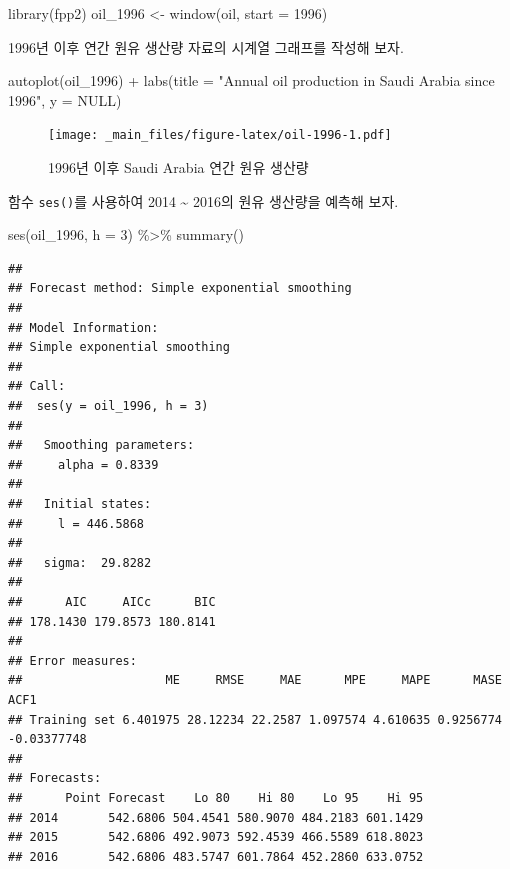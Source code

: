 \documentclass[
]{book}
\newenvironment{Shaded}{\begin{snugshade}}{\end{snugshade}}
\newcommand{\AttributeTok}[1]{\textcolor[rgb]{0.77,0.63,0.00}{#1}}
\newcommand{\ConstantTok}[1]{\textcolor[rgb]{0.00,0.00,0.00}{#1}}
\newcommand{\DecValTok}[1]{\textcolor[rgb]{0.00,0.00,0.81}{#1}}
\newcommand{\FunctionTok}[1]{\textcolor[rgb]{0.00,0.00,0.00}{#1}}
\newcommand{\NormalTok}[1]{#1}
\newcommand{\OtherTok}[1]{\textcolor[rgb]{0.56,0.35,0.01}{#1}}
\newcommand{\SpecialCharTok}[1]{\textcolor[rgb]{0.00,0.00,0.00}{#1}}
\newcommand{\StringTok}[1]{\textcolor[rgb]{0.31,0.60,0.02}{#1}}
\begin{document}
\begin{Shaded}
\begin{Highlighting}[]
\FunctionTok{library}\NormalTok{(fpp2)}
\NormalTok{oil\_1996 }\OtherTok{\textless{}{-}} \FunctionTok{window}\NormalTok{(oil, }\AttributeTok{start =} \DecValTok{1996}\NormalTok{)}
\end{Highlighting}
\end{Shaded}

1996년 이후 연간 원유 생산량 자료의 시계열 그래프를 작성해 보자.

\begin{Shaded}
\begin{Highlighting}[]
\FunctionTok{autoplot}\NormalTok{(oil\_1996) }\SpecialCharTok{+} 
  \FunctionTok{labs}\NormalTok{(}\AttributeTok{title =} \StringTok{"Annual oil production in Saudi Arabia since 1996"}\NormalTok{, }\AttributeTok{y =} \ConstantTok{NULL}\NormalTok{)}
\end{Highlighting}
\end{Shaded}

\begin{figure}
\centering
\texttt{[image: \_main\_files/figure-latex/oil-1996-1.pdf]}
\caption{\label{fig:oil-1996}1996년 이후 Saudi Arabia 연간 원유 생산량}
\end{figure}

함수 \texttt{ses()}를 사용하여 2014 \textasciitilde{} 2016의 원유 생산량을 예측해 보자.

\begin{Shaded}
\begin{Highlighting}[]
\FunctionTok{ses}\NormalTok{(oil\_1996, }\AttributeTok{h =} \DecValTok{3}\NormalTok{) }\SpecialCharTok{\%\textgreater{}\%} 
  \FunctionTok{summary}\NormalTok{()}
\end{Highlighting}
\end{Shaded}

\begin{verbatim}
## 
## Forecast method: Simple exponential smoothing
## 
## Model Information:
## Simple exponential smoothing 
## 
## Call:
##  ses(y = oil_1996, h = 3) 
## 
##   Smoothing parameters:
##     alpha = 0.8339 
## 
##   Initial states:
##     l = 446.5868 
## 
##   sigma:  29.8282
## 
##      AIC     AICc      BIC 
## 178.1430 179.8573 180.8141 
## 
## Error measures:
##                    ME     RMSE     MAE      MPE     MAPE      MASE        ACF1
## Training set 6.401975 28.12234 22.2587 1.097574 4.610635 0.9256774 -0.03377748
## 
## Forecasts:
##      Point Forecast    Lo 80    Hi 80    Lo 95    Hi 95
## 2014       542.6806 504.4541 580.9070 484.2183 601.1429
## 2015       542.6806 492.9073 592.4539 466.5589 618.8023
## 2016       542.6806 483.5747 601.7864 452.2860 633.0752
\end{verbatim}
\end{document}
